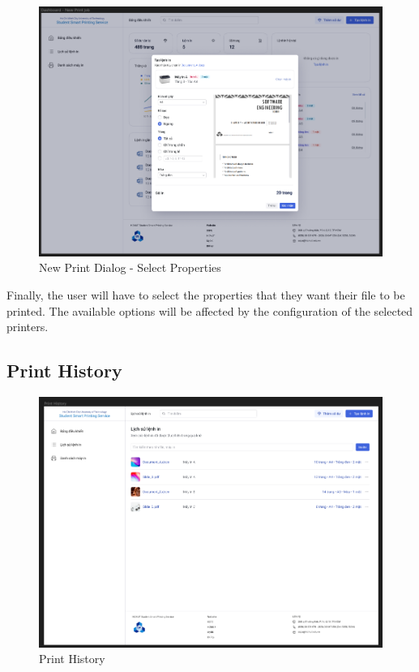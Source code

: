 \begin{figure}[H]
  \includegraphics[max width=0.9\linewidth]{chapters/5. mvp-wireframe/4 - Dashboard - Select Properties.png}
  \caption{New Print Dialog - Select Properties}%
\end{figure}

Finally, the user will have to select the properties that they want their file to be printed. The available options will be affected by the configuration of the selected printers.

\subsection{Print History}

\begin{figure}[H]
  \includegraphics[max width=0.9\linewidth]{chapters/5. mvp-wireframe/5. Print History.png}
  \caption{Print History}%
\end{figure}

